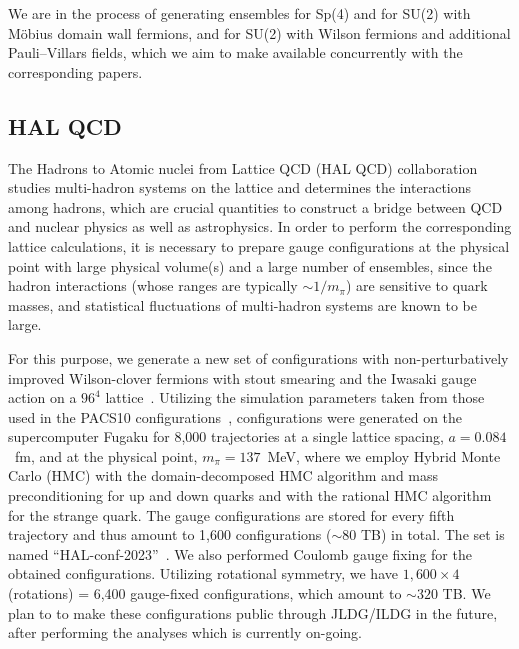 \documentclass[a4paper,11pt]{article}
\begin{document}
We are in the process of generating ensembles
for Sp(4) 
and for SU(2) 
with Möbius domain wall fermions,
and for SU(2) 
with Wilson fermions
and additional Pauli--Villars fields,
which we aim to make available concurrently with the corresponding papers.



\subsection{HAL QCD}
The Hadrons to Atomic nuclei from Lattice QCD (HAL QCD) collaboration
studies multi-hadron systems on the lattice and determines the
interactions among hadrons, which are crucial quantities to construct
a bridge between QCD and nuclear physics as well as astrophysics.
%
In order to perform the corresponding lattice calculations, it is
necessary to prepare gauge configurations at the physical point with
large physical volume(s) and a large number of ensembles, since the
hadron interactions (whose ranges are typically $\sim 1/m_\pi$) are
sensitive to quark masses, and statistical fluctuations of
multi-hadron systems are known to be large.

For this purpose, we generate a new set of configurations with
 non-perturbatively improved Wilson-clover fermions with
stout smearing and the Iwasaki gauge action on a $96^4$
lattice~\cite{Aoyama:2024cko}.  Utilizing the simulation parameters
taken from those used in the PACS10
configurations~\cite{Ishikawa:2018jee,PACS:2019ofv}, configurations
were generated on the supercomputer Fugaku for 8,000 trajectories at a
single lattice spacing, $a = 0.084$~fm, and at the physical point,
$m_\pi = 137$~MeV, where we employ Hybrid Monte Carlo (HMC) with the
domain-decomposed HMC algorithm and mass preconditioning for up and
down quarks and with the rational HMC algorithm for the strange quark.
The gauge configurations are stored for every fifth trajectory and
thus amount to 1,600 configurations ($\sim 80$ TB) in total. The set
is named ``HAL-conf-2023''~\cite{Aoyama:2024cko}.
%
We also performed Coulomb gauge fixing for the obtained
configurations.  Utilizing rotational symmetry, we have $1,600 \times
4$ (rotations) = 6,400 gauge-fixed configurations, which amount to
$\sim 320$ TB.  We plan to to make these configurations public through
JLDG/ILDG in the future, after performing the analyses which is
currently on-going.
\end{document}
